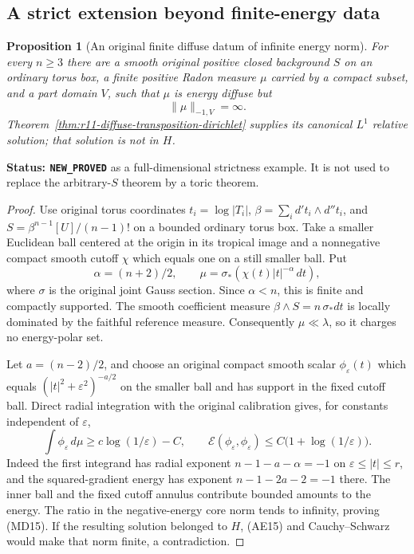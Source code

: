 \documentclass[11pt,a4paper]{article}
\numberwithin{equation}{section}
\newtheorem{proposition}[theorem]{Proposition}
\theoremstyle{definition}
\theoremstyle{remark}
\begin{document}
\subsection{A strict extension beyond finite-energy data}

\begin{proposition}[An original finite diffuse datum of infinite energy norm]
\label{prop:r11-infinite-energy-diffuse-example}
For every $n\geq3$ there are a smooth original positive closed
background $S$ on an ordinary torus box, a finite positive Radon
measure $\mu$ carried by a compact subset, and a part domain $V$,
such that $\mu$ is energy diffuse but
\[
                              \|\mu\|_{-1,V}=\infty.
 \tag{MD15}
\]
Theorem~\ref{thm:r11-diffuse-transposition-dirichlet} supplies
its canonical $L^1$ relative solution; that solution is not in $H$.
\end{proposition}

\noindent\textbf{Status: \texttt{NEW\_PROVED}} as a full-dimensional
strictness example.  It is not used to replace the arbitrary-$S$
theorem by a toric theorem.

\begin{proof}
Use original torus coordinates $t_i=\log|T_i|$,
$\beta=\sum_i d't_i\wedge d''t_i$, and
$S=\beta^{n-1}[U]/(n-1)!$ on a bounded ordinary torus box.
Take a smaller Euclidean ball centered at the origin in its
tropical image and a nonnegative compact smooth cutoff $\chi$
which equals one on a still smaller ball.  Put
\[
 \alpha=(n+2)/2,\qquad
                 \mu=\sigma_*(\chi(t)|t|^{-\alpha}\,dt),
 \tag{MD16}
\]
where $\sigma$ is the original joint Gauss section.
Since $\alpha<n$, this is finite and compactly supported.
The smooth coefficient measure $\beta\wedge S=n\,\sigma_*dt$
is locally dominated by the faithful reference measure.
Consequently $\mu\ll\lambda$, so it charges no energy-polar set.

Let $a=(n-2)/2$, and choose an original compact smooth scalar
$\phi_\varepsilon(t)$ which equals
$(|t|^2+\varepsilon^2)^{-a/2}$ on the smaller ball and has
support in the fixed cutoff ball.  Direct radial integration
with the original calibration gives, for constants independent
of $\varepsilon$,
\[
 \int\phi_\varepsilon\,d\mu\geq c\log(1/\varepsilon)-C,\qquad
             \mathcal E(\phi_\varepsilon,\phi_\varepsilon)
                      \leq C\bigl(1+\log(1/\varepsilon)\bigr).
 \tag{MD17}
\]
Indeed the first integrand has radial exponent
$n-1-a-\alpha=-1$ on $\varepsilon\leq|t|\leq r$,
and the squared-gradient energy has exponent
$n-1-2a-2=-1$ there.  The inner ball and the fixed cutoff
annulus contribute bounded amounts to the energy.
The ratio in the negative-energy core norm tends to infinity,
proving (MD15).  If the resulting solution belonged to $H$,
(AE15) and Cauchy--Schwarz would make that norm finite,
a contradiction.
\end{proof}
\end{document}
